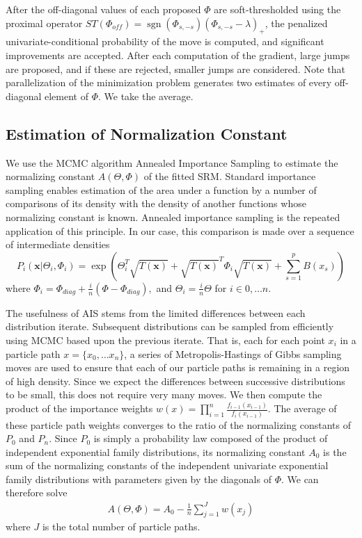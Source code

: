 \documentclass{samkoelleprelimworking}
\DeclareMathOperator{\sgn}{sgn}
\begin{document}
After the off-diagonal values of each proposed $\Phi$ are soft-thresholded using the proximal operator $ST(\Phi_{off}) = \sgn{ (\Phi_{s,-s} )} (\Phi_{s,-s} - \lambda)_+$, the penalized univariate-conditional probability of the move is computed, and significant improvements are accepted.  After each computation of the gradient, large jumps are proposed, and if these are rejected, smaller jumps are considered.  Note that parallelization of the minimization problem generates two estimates of every off-diagonal element of $\Phi$.  We take the average.

\subsection{Estimation of Normalization Constant}
We use the MCMC algorithm Annealed Importance Sampling to estimate the normalizing constant $A(\Theta, \Phi)$ of the fitted SRM.  Standard importance sampling enables estimation of the area under a function by a number of comparisons of its density with the density of another functions whose normalizing constant is known.   Annealed importance sampling is the repeated application of this principle.  In our case, this comparison is made over a sequence of intermediate densities
\[P_i(\bm{x} \vert \Theta_i, \Phi_i) =  \exp(\Theta_i^T \sqrt{T(\bm{x})} + \sqrt{T(\bm{x})}^T\Phi_i \sqrt{T(\bm{x})} + \sum_{s=1}^p B(x_s)) \]
where $\Phi_i = \Phi_{diag} + \frac{i}{n} (\Phi - \Phi_{diag}),$ and $\Theta_i = \frac{i}{n}{\Theta}$ for $i \in 0, \dotsc n$.  

The usefulness of AIS stems from the limited differences between each distribution iterate.  Subsequent distributions can be sampled from efficiently using MCMC based upon the previous iterate.  That is, each for each point $x_i$ in a particle path $x = \{x_0, \dotsc x_n\}$, a series of Metropolis-Hastings of Gibbs sampling moves are used to ensure that each of our particle paths is remaining in a region of high density.  Since we expect the differences between successive distributions to be small, this does not require very many moves.  We then compute the product of the importance weights $w(x) = \prod_{i=1}^n \frac{f_{i-1}(x_{i-1})}{f_{i}(x_{i-1})}$.  The average of these particle path weights converges to the ratio of the normalizing constants of $P_0$ and $P_n$.  Since $P_0$ is simply a probability law composed of the product of independent exponential family distributions, its normalizing constant $A_0$ is the sum of the normalizing constants of the independent univariate exponential family distributions with parameters given by the diagonals of $\Phi$.  We can therefore solve
\begin{align}
A(\Theta,\Phi) = A_0 - \frac{1}{n} \sum_{j=1}^{J} w(x_j)
\end{align}
where $J$ is the total number of particle paths.  
\end{document}
